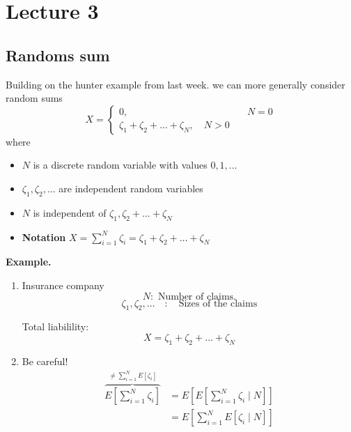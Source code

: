 \documentclass{article}
\theoremstyle{remark}
\begin{document}
\newpage

\newpage
\section{Lecture 3}%
\label{sec:lecture_3}

\subsection{Randoms sum}%
\label{sub:randoms_sum}

Building on the hunter example from last week. we can more generally consider random sums \[
  X = \begin{cases}
    0,  &  \quad  N = 0 \\
    \zeta_{1} + \zeta _{2} + \ldots + \zeta_N , \quad  N >0  
  \end{cases}
\] 
where 
\begin{itemize}
  \item $N$ is a discrete random variable with values $0,1, \ldots$ 
  \item $\zeta _{1}, \zeta _{2}, \ldots $ are independent random variables
  \item $N$ is independent of $\zeta _{1}, \zeta _{2} + \ldots + \zeta _{N}$ 
  \item \textbf{Notation}  $X = \sum_{i=1}^{N} \zeta _{i} = \zeta _{1} + \zeta _{2} + \ldots + \zeta _{N}$ 
\end{itemize}

\begin{tcolorbox}
  \textbf{Example.} 
  \begin{enumerate}
    \item Insurance company \[
    N: \text{ Number of claims.} 
    \] 
  \[
    \zeta _{1} , \zeta _{2} , \ldots \quad  : \quad \text{Sizes of the claims} 
  \] 

  Total liabilility: \[
  X = \zeta _{1}+ \zeta _{2} + \ldots + \zeta _{N}
  \] 
\item  Be careful! \[
    \begin{split}
      \overbrace{E\left[ \sum_{i=1}^{N} \zeta _{i} \right]}^{\neq \sum_{i=1}^{N} E\left[ \zeta _{i} \right]}   & = E\left[ E\left[ \sum_{i=1}^{N} \zeta _{i}  \mid N \right] \right]\\
&= E\left[ \sum_{i=1}^{N} E\left[ \zeta _{i}  \mid  N \right] \right] 
    \end{split} 
\] 
  \end{enumerate}
\end{tcolorbox}
\end{document}
